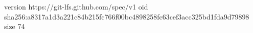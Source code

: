 version https://git-lfs.github.com/spec/v1
oid sha256:a8317a1d3a221c84b215fc766f00bc4898258fc63cef3acc325bd1fda9d79898
size 74
